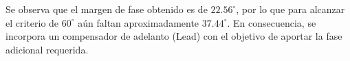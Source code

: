 Se observa que el margen de fase obtenido es de $22.56^\circ$, por lo que para alcanzar el criterio de $60^\circ$ aún faltan aproximadamente $37.44^\circ$. En consecuencia, se incorpora un compensador de adelanto (Lead) con el objetivo de aportar la fase adicional requerida.




